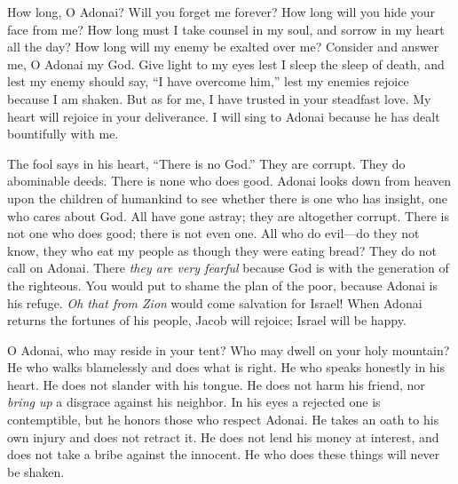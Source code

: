 \begin{biblechapter} %
 How long, O Adonai? Will you forget me forever? 
How long will you hide your face from me?
\verse How long must I take counsel in my soul, 
and sorrow in my heart all the day? 
How long will my enemy be exalted over me?
\verse Consider and answer me, O Adonai my God. 
Give light to my eyes 
lest I sleep the sleep of death,
\verse and lest my enemy should say, “I have overcome him,” 
lest my enemies rejoice because I am shaken.
\verse But as for me, I have trusted in your steadfast love. 
My heart will rejoice in your deliverance.
\verse {} I will sing to Adonai 
because he has dealt bountifully with me.
\end{biblechapter}

\begin{biblechapter} %
 The fool says in his heart, “There is no God.” 
They are corrupt. 
They do abominable deeds. 
There is none who does good.
\verse Adonai looks down from heaven upon the children of humankind 
to see whether there is one who has insight, 
one who cares about God.
\verse All have gone astray; 
they are altogether corrupt. 
There is not one who does good; 
there is not even one.
\verse All who do evil—do they not know, 
they who eat my people as though they were eating bread? 
They do not call on Adonai.
\verse There \textit{they are very fearful} 
because God is with the generation of the righteous.
\verse You would put to shame the plan of the poor, 
because Adonai is his refuge.
\verse \textit{Oh that from Zion} would come salvation for Israel! 
When Adonai returns the fortunes of his people, 
Jacob will rejoice; Israel will be happy.
\end{biblechapter}

\begin{biblechapter} %
 O Adonai, who may reside in your tent? 
Who may dwell on your holy mountain?
\verse He who walks blamelessly and does what is right. 
He who speaks honestly in his heart.
\verse He does not slander with his tongue. 
He does not harm his friend, 
nor \textit{bring up} a disgrace against his neighbor.
\verse In his eyes a rejected one is contemptible, 
but he honors those who respect Adonai. 
He takes an oath to his own injury and does not retract it.
\verse He does not lend his money at interest, 
and does not take a bribe against the innocent. 
He who does these things 
will never be shaken.
\end{biblechapter}

